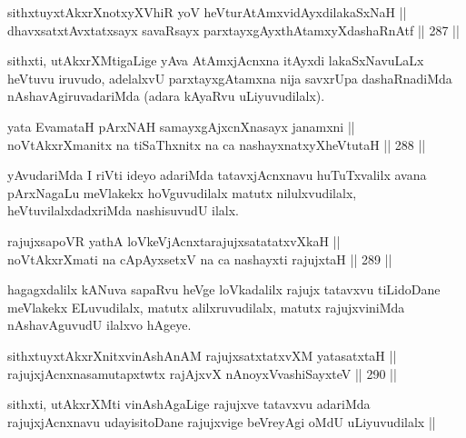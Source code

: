 
\begin{shl}
sithxtuyxtAkxrXnotxyXVhiR yoV heVturAtAmxvidAyxdilakaSxNaH || \\
dhavxsatxtAvxtatxsayx savaRsayx parxtayxgAyxthAtamxyXdashaRnAtf ||  287 ||  
\end{shl}

\begin{artha}
sithxti, utAkxrXMtigaLige yAva AtAmxjAcnxna itAyxdi lakaSxNavuLaLx
heVtuvu iruvudo, adelalxvU parxtayxgAtamxna nija savxrUpa
dashaRnadiMda nAshavAgiruvadariMda (adara kAyaRvu uLiyuvudilalx).
\end{artha}

\begin{shl}
yata EvamataH pArxNAH samayxgAjxcnXnasayx janamxni || \\
noVtAkxrXmanitx na tiSaThxnitx na ca nashayxnatxyXheVtutaH ||  288 ||  
\end{shl}

\begin{artha}
yAvudariMda I riVti ideyo adariMda tatavxjAcnxnavu huTuTxvalilx avana
pArxNagaLu meVlakekx hoVguvudilalx matutx nilulxvudilalx,
heVtuvilalxdadxriMda nashisuvudU ilalx.
\end{artha}

\begin{shl}
rajujxsapoVR yathA loVkeV\s jAcnxtarajujxsatatatxvXkaH || \\
noVtAkxrXmati na cApAyxsetxV na ca nashayxti rajujxtaH ||  289 ||  
\end{shl}

\begin{artha}
hagagxdalilx kANuva sapaRvu heVge loVkadalilx rajujx tatavxvu
tiLidoDane meVlakekx ELuvudilalx, matutx alilxruvudilalx, matutx
rajujxviniMda nAshavAguvudU ilalxvo hAgeye.
\end{artha}

\begin{shl}
sithxtuyxtAkxrXnitxvinAshAnAM rajujxsatxtatxvXM yatasatxtaH || \\
rajujxjAcnxnasamutapxtwtx rajAjxvX nAnoyxV\s vashiSayxteV ||  290 ||  
\end{shl}

\begin{artha}
sithxti, utAkxrXMti vinAshAgaLige rajujxve tatavxvu adariMda
rajujxjAcnxnavu udayisitoDane rajujxvige beVreyAgi oMdU uLiyuvudilalx ||
\end{artha}

